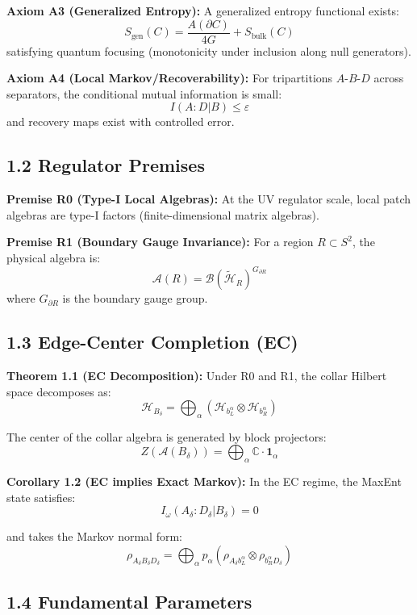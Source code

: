 \textbf{Axiom A3 (Generalized Entropy):} A generalized entropy functional exists: \[S_{\text{gen}}(C) = \frac{A(\partial C)}{4G} + S_{\text{bulk}}(C)\] satisfying quantum focusing (monotonicity under inclusion along null generators).

\textbf{Axiom A4 (Local Markov/Recoverability):} For tripartitions \(A\)-\(B\)-\(D\) across separators, the conditional mutual information is small: \[I(A:D|B) \leq \varepsilon\] and recovery maps exist with controlled error.

\subsection{1.2 Regulator Premises}\label{12-regulator-premises}

\textbf{Premise R0 (Type-I Local Algebras):} At the UV regulator scale, local patch algebras are type-I factors (finite-dimensional matrix algebras).

\textbf{Premise R1 (Boundary Gauge Invariance):} For a region \(R \subset S^2\), the physical algebra is: \[\mathcal{A}(R) = \mathcal{B}(\tilde{\mathcal{H}}_R)^{G_{\partial R}}\] where \(G_{\partial R}\) is the boundary gauge group.

\subsection{1.3 Edge-Center Completion (EC)}\label{13-edge-center-completion-ec}

\textbf{Theorem 1.1 (EC Decomposition):} Under R0 and R1, the collar Hilbert space decomposes as: \[\mathcal{H}_{B_\delta} = \bigoplus_{\alpha} \left(\mathcal{H}_{b_L^\alpha} \otimes \mathcal{H}_{b_R^\alpha}\right)\]

The center of the collar algebra is generated by block projectors: \[Z(\mathcal{A}(B_\delta)) = \bigoplus_\alpha \mathbb{C} \cdot \mathbf{1}_\alpha\]

\textbf{Corollary 1.2 (EC implies Exact Markov):} In the EC regime, the MaxEnt state satisfies: \[I_\omega(A_\delta : D_\delta | B_\delta) = 0\]

and takes the Markov normal form: \[\rho_{A_\delta B_\delta D_\delta} = \bigoplus_\alpha p_\alpha \left(\rho_{A_\delta b_L^\alpha} \otimes \rho_{b_R^\alpha D_\delta}\right)\]

\subsection{1.4 Fundamental Parameters}\label{14-fundamental-parameters}

